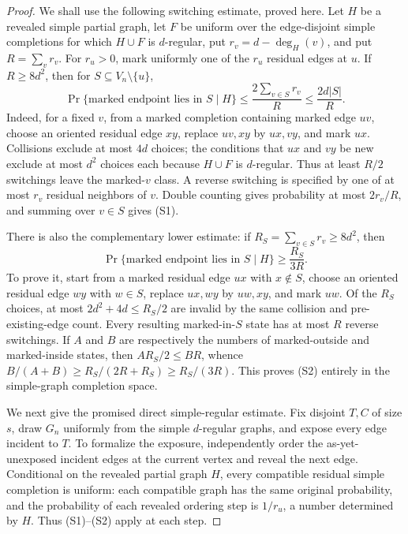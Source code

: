 \documentclass{article}
\begin{document}
\begin{proof}
We shall use the following switching estimate, proved here.  Let \(H\) be a revealed simple partial graph, let \(F\) be uniform over the edge-disjoint simple completions for which \(H\cup F\) is \(d\)-regular, put \(r_v=d-\deg_H(v)\), and put \(R=\sum_vr_v\).  For \(r_u>0\), mark uniformly one of the \(r_u\) residual edges at \(u\).  If \(R\ge8d^2\), then for \(S\subseteq V_n\setminus\{u\}\),
\[
\Pr\{\text{marked endpoint lies in }S\mid H\}\le\frac{2\sum_{v\in S}r_v}{R}\le\frac{2d|S|}{R}.
\tag{S1}
\]
Indeed, for a fixed \(v\), from a marked completion containing marked edge \(uv\), choose an oriented residual edge \(xy\), replace \(uv,xy\) by \(ux,vy\), and mark \(ux\).  Collisions exclude at most \(4d\) choices; the conditions that \(ux\) and \(vy\) be new exclude at most \(d^2\) choices each because \(H\cup F\) is \(d\)-regular.  Thus at least \(R/2\) switchings leave the marked-\(v\) class.  A reverse switching is specified by one of at most \(r_v\) residual neighbors of \(v\).  Double counting gives probability at most \(2r_v/R\), and summing over \(v\in S\) gives (S1).

There is also the complementary lower estimate: if \(R_S=\sum_{v\in S}r_v\ge8d^2\), then
\[
\Pr\{\text{marked endpoint lies in }S\mid H\}\ge\frac{R_S}{3R}.
\tag{S2}
\]
To prove it, start from a marked residual edge \(ux\) with \(x\notin S\), choose an oriented residual edge \(wy\) with \(w\in S\), replace \(ux,wy\) by \(uw,xy\), and mark \(uw\).  Of the \(R_S\) choices, at most \(2d^2+4d\le R_S/2\) are invalid by the same collision and pre-existing-edge count.  Every resulting marked-in-\(S\) state has at most \(R\) reverse switchings.  If \(A\) and \(B\) are respectively the numbers of marked-outside and marked-inside states, then \(AR_S/2\le BR\), whence \(B/(A+B)\ge R_S/(2R+R_S)\ge R_S/(3R)\).  This proves (S2) entirely in the simple-graph completion space.

We next give the promised direct simple-regular estimate.  Fix disjoint \(T,C\) of size \(s\), draw \(G_n\) uniformly from the simple \(d\)-regular graphs, and expose every edge incident to \(T\).  To formalize the exposure, independently order the as-yet-unexposed incident edges at the current vertex and reveal the next edge.  Conditional on the revealed partial graph \(H\), every compatible residual simple completion is uniform: each compatible graph has the same original probability, and the probability of each revealed ordering step is \(1/r_u\), a number determined by \(H\).  Thus (S1)--(S2) apply at each step.


\end{proof}
\end{document}
